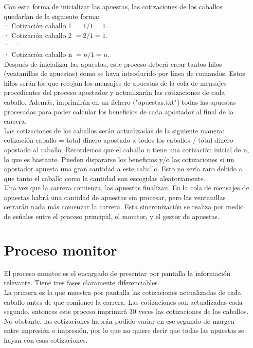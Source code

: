 \documentclass[12pt]{article}
\begin{document}
Con esta forma de inicializar las apuestas, las cotizaciones de los caballos quedarían de la siguiente forma:\\
· Cotización caballo 1 $= 1/1 = 1$.\\
· Cotización caballo 2 $= 2/1 = 1$.\\
···\\
· Cotización caballo n $= n/1 = n$.\\

Después de inicializar las apuestas, este proceso deberá crear tantos hilos (ventanillas de apuestas) como se haya introducido por línea de comandos. Estos hilos serán los que recojan los mensajes de apuestas de la cola de mensajes procedientes del proceso apostador y actualizarán las cotizaciones de cada caballo. Además, imprimirán en un fichero ("apuestas.txt") todas las apuestas procesadas para poder calcular los beneficios de cada apostador al final de la carrera.\\

Las cotizaciones de los caballos serán actualizadas de la siguiente manera: cotización caballo = total dinero apostado a todos los caballos / total dinero apostado al caballo. Recordemos que el caballo n tiene una cotización inicial de n, lo que es bastante. Pueden dispararse los beneficios y/o las cotizaciones si un apostador apuesta una gran cantidad a este caballo. Esto no sería raro debido a que tanto el caballo como la cantidad son escogidas aleatoriamente.\\

Una vez que la carrera comienza, las apuestas finalizan. En la cola de mensajes de apuestas habrá una cantidad de apuestas sin procesar, pero las ventanillas cerrarán nada más comenzar la carrera. Esta sincronización se realiza por medio de señales entre el proceso principal, el monitor, y el gestor de apuestas.\\

\section{Proceso monitor}
El proceso monitor es el encargado de presentar por pantalla la información relevante. Tiene tres fases claramente diferenciables.\\

La primera es la que muestra por pantalla las cotizaciones actualizadas de cada caballo antes de que comience la carrera. Las cotizaciones son actualizadas cada segundo, entonces este proceso imprimirá 30 veces las cotizaciones de los caballos. No obstante, las cotizaciones habrán podido variar en ese segundo de margen entre impresión e impresión, por lo que no quiere decir que todas las apuestas se hayan con esas cotizaciones.\\
\end{document}
